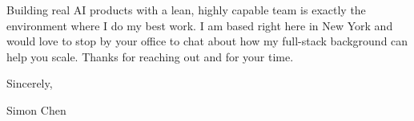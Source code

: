 \documentclass[letterpaper,11pt]{article}
\begin{document}
Building real AI products with a lean, highly capable team is exactly the environment where I do my best work. I am based right here in New York and would love to stop by your office to chat about how my full-stack background can help you scale. Thanks for reaching out and for your time.

\vspace{10pt}
Sincerely,

\vspace{20pt}
Simon Chen
\end{document}
